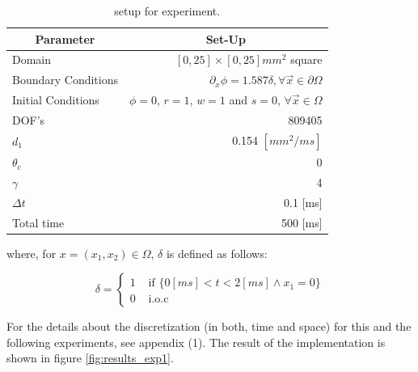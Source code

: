 \begin{table}[H]
\centering
\begin{tabular}{@{}lr@{}}
\toprule
\multicolumn{1}{c}{Parameter} & \multicolumn{1}{c}{Set-Up}                                            \\ \midrule
Domain                        & $[0, 25] \times [0, 25] mm^2$ square                                    \\
Boundary Conditions           & $\partial_x \phi = 1.587 \delta, \forall \vec{x} \in \partial \Omega$ \\
Initial Conditions            & $\phi = 0$, $r = 1$, $w = 1$ and $s = 0$, $\forall \vec{x} \in \Omega$             \\
DOF's       & 809405                                                                    \\
$d_1$						 &   0.154 $[mm^2/ms]$ \\
$\theta_c$                    & 0                                                                   \\
$\gamma$                      & 4                                                                     \\
$\Delta t $                  & 0.1 [ms]                                                                 \\
Total time & 500 [ms] \\ \bottomrule
\end{tabular}
\caption{setup for experiment.} \label{tab:mde_min_setup_1}
\end{table}

where, for $x = (x_1, x_2) \in \Omega$, $\delta$ is defined as follows:

\begin{equation}
\delta = \left\lbrace \begin{array}{cc}
1 & \text{ if }  \{ 0 [ms] < t < 2 [ms] \wedge x_1 = 0  \} \\
0 & \text{ i.o.c }
\end{array} \right.
\end{equation}

For the details about the discretization (in both, time and space) for this and the following experiments, see appendix (1). The result of the implementation is shown in figure \ref{fig:results_exp1}.

